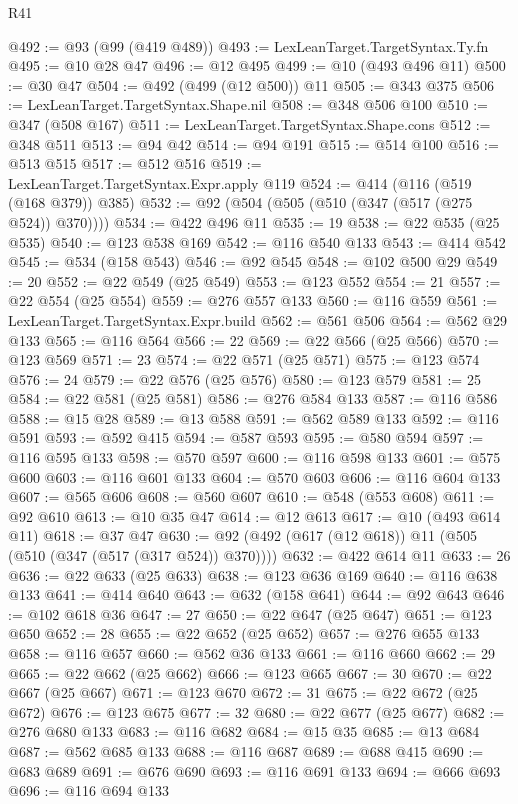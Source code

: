 \begin{lexlean}{R41}
\begin{coremodule}
@492 := @93 (@99 (@419 @489))
@493 := LexLeanTarget.TargetSyntax.Ty.fn
@495 := @10 @28 @47
@496 := @12 @495
@499 := @10 (@493 @496 @11)
@500 := @30 @47
@504 := @492 (@499 (@12 @500)) @11
@505 := @343 @375
@506 := LexLeanTarget.TargetSyntax.Shape.nil
@508 := @348 @506 @100
@510 := @347 (@508 @167)
@511 := LexLeanTarget.TargetSyntax.Shape.cons
@512 := @348 @511
@513 := @94 @42
@514 := @94 @191
@515 := @514 @100
@516 := @513 @515
@517 := @512 @516
@519 := LexLeanTarget.TargetSyntax.Expr.apply @119
@524 := @414 (@116 (@519 (@168 @379)) @385)
@532 := @92 (@504 (@505 (@510 (@347 (@517 (@275 @524)) @370))))
@534 := @422 @496 @11
@535 := 19
@538 := @22 @535 (@25 @535)
@540 := @123 @538 @169
@542 := @116 @540 @133
@543 := @414 @542
@545 := @534 (@158 @543)
@546 := @92 @545
@548 := @102 @500 @29
@549 := 20
@552 := @22 @549 (@25 @549)
@553 := @123 @552
@554 := 21
@557 := @22 @554 (@25 @554)
@559 := @276 @557 @133
@560 := @116 @559
@561 := LexLeanTarget.TargetSyntax.Expr.build
@562 := @561 @506
@564 := @562 @29 @133
@565 := @116 @564
@566 := 22
@569 := @22 @566 (@25 @566)
@570 := @123 @569
@571 := 23
@574 := @22 @571 (@25 @571)
@575 := @123 @574
@576 := 24
@579 := @22 @576 (@25 @576)
@580 := @123 @579
@581 := 25
@584 := @22 @581 (@25 @581)
@586 := @276 @584 @133
@587 := @116 @586
@588 := @15 @28
@589 := @13 @588
@591 := @562 @589 @133
@592 := @116 @591
@593 := @592 @415
@594 := @587 @593
@595 := @580 @594
@597 := @116 @595 @133
@598 := @570 @597
@600 := @116 @598 @133
@601 := @575 @600
@603 := @116 @601 @133
@604 := @570 @603
@606 := @116 @604 @133
@607 := @565 @606
@608 := @560 @607
@610 := @548 (@553 @608)
@611 := @92 @610
@613 := @10 @35 @47
@614 := @12 @613
@617 := @10 (@493 @614 @11)
@618 := @37 @47
@630 := @92 (@492 (@617 (@12 @618)) @11 (@505 (@510 (@347 (@517 (@317 @524)) @370))))
@632 := @422 @614 @11
@633 := 26
@636 := @22 @633 (@25 @633)
@638 := @123 @636 @169
@640 := @116 @638 @133
@641 := @414 @640
@643 := @632 (@158 @641)
@644 := @92 @643
@646 := @102 @618 @36
@647 := 27
@650 := @22 @647 (@25 @647)
@651 := @123 @650
@652 := 28
@655 := @22 @652 (@25 @652)
@657 := @276 @655 @133
@658 := @116 @657
@660 := @562 @36 @133
@661 := @116 @660
@662 := 29
@665 := @22 @662 (@25 @662)
@666 := @123 @665
@667 := 30
@670 := @22 @667 (@25 @667)
@671 := @123 @670
@672 := 31
@675 := @22 @672 (@25 @672)
@676 := @123 @675
@677 := 32
@680 := @22 @677 (@25 @677)
@682 := @276 @680 @133
@683 := @116 @682
@684 := @15 @35
@685 := @13 @684
@687 := @562 @685 @133
@688 := @116 @687
@689 := @688 @415
@690 := @683 @689
@691 := @676 @690
@693 := @116 @691 @133
@694 := @666 @693
@696 := @116 @694 @133

\end{coremodule}
\end{lexlean}
